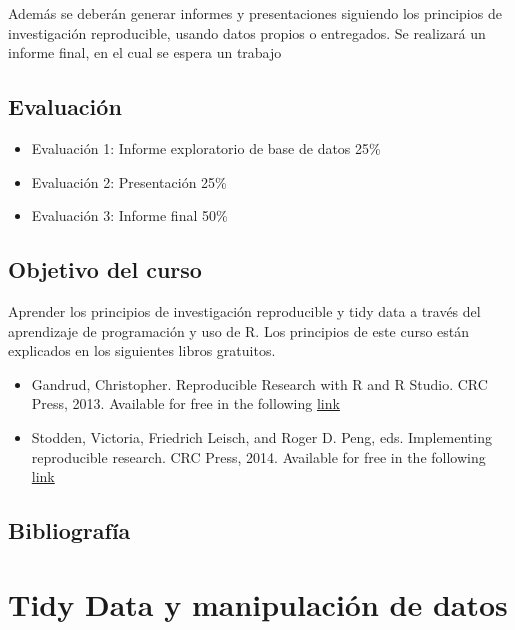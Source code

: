 \documentclass[]{book}
\providecommand{\tightlist}{%
  \setlength{\itemsep}{0pt}\setlength{\parskip}{0pt}}
\begin{document}
Además se deberán generar informes y presentaciones siguiendo los
principios de investigación reproducible, usando datos propios o
entregados. Se realizará un informe final, en el cual se espera un
trabajo

\hypertarget{evaluacion}{%
\section{Evaluación}\label{evaluacion}}

\begin{itemize}
\tightlist
\item
  Evaluación 1: Informe exploratorio de base de datos 25\%
\item
  Evaluación 2: Presentación 25\%
\item
  Evaluación 3: Informe final 50\%
\end{itemize}

\hypertarget{objetivo-del-curso}{%
\section{Objetivo del curso}\label{objetivo-del-curso}}

Aprender los principios de investigación reproducible y tidy data a
través del aprendizaje de programación y uso de R. Los principios de
este curso están explicados en los siguientes libros gratuitos.

\begin{itemize}
\tightlist
\item
  Gandrud, Christopher. Reproducible Research with R and R Studio. CRC
  Press, 2013. Available for free in the following
  \href{https://englianhu.files.wordpress.com/2016/01/reproducible-research-with-r-and-studio-2nd-edition.pdf}{link}
\item
  Stodden, Victoria, Friedrich Leisch, and Roger D. Peng, eds.
  Implementing reproducible research. CRC Press, 2014. Available for
  free in the following
  \href{http://web.stanford.edu/~vcs/papers/ijclp-STODDEN-2009.pdf}{link}
\end{itemize}

\hypertarget{bibliografia}{%
\section{Bibliografía}\label{bibliografia}}

\hypertarget{tidydata}{%
\chapter{Tidy Data y manipulación de datos}\label{tidydata}}
\end{document}
